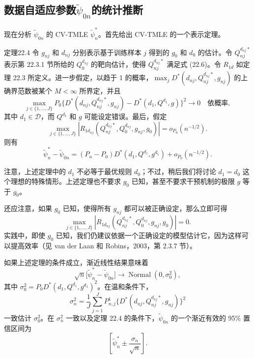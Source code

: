 \subsection{数据自适应参数\texorpdfstring{$\tilde\psi_{0n}$}{ψ̃₀ₙ}的统计推断}

现在分析 $\tilde\psi_{0n}$ 的 CV-TMLE $\tilde\psi_n^*$。首先给出 CV-TMLE 的一个表示定理。

\begin{bookresult}{定理}{22.4}
令 $g_{nj}$ 和 $d_{nj}$ 分别表示基于训练样本 $j$ 得到的 $g_0$ 和 $d_0$ 的估计。令 $Q_{nj}^{d_{nj}*}$ 表示第 22.3.1 节所给的 $Q_0^{d_{nj}}$ 的靶向估计，使得 $Q_{nj}^{d_{nj}*}$ 满足式 (22.6)。令 $R_{1d}$ 如定理 22.3 所定义。进一步假定，以趋于 1 的概率，$\max_jD^*(d_{nj},Q_{nj}^{d_{nj}*},g_{nj})$ 的上确界范数被某个 $M<\infty$ 所界定，并且
\[
 \max_{j\in\{1,\ldots,J\}}P_0
 \bigl\{D^*(d_{nj},Q_{nj}^{d_{nj}*},g_{nj})-D^*(d_1,Q^{d_1},g)\bigr\}^2
 \to0\quad\text{依概率},
\]
其中 $d_1\in\mathcal D$，而 $Q^{d_1}$ 和 $g$ 可能设定错误。最后，假定
\[
 \max_{j\in\{1,\ldots,J\}}
 \left|R_{1d_{nj}}(Q_{nj}^{d_{nj}*},Q_0^{d_{nj}},g_{nj},g_0)\right|
 =o_{P_0}(n^{-1/2}).
\]
则有
\[
 \tilde\psi_n^*-\tilde\psi_{0n}
 =(P_n-P_0)D^*(d_1,Q^{d_1},g^{d_1})+o_{P_0}(n^{-1/2}).
\]
\end{bookresult}

注意，上述定理中的 $d_1$ 不必等于最优规则 $d_0$；不过，稍后我们将讨论 $d_1=d_0$ 这个理想的特殊情形。上述定理也不要求 $g_0$ 已知，甚至不要求干预机制的极限 $g$ 等于 $g_0$。

还应注意，如果 $g_0$ 已知，使得所有 $g_{nj}$ 都可以被正确设定，那么立即可得
\[
 \max_{j\in\{1,\ldots,J\}}
 \left|R_{1d_{nj}}(Q_{nj}^{d_{nj}*},Q_0^{d_{nj}},g_{nj},g_0)\right|=0.
\]
实践中，即使 $g_0$ 已知，我们仍建议依据一个正确设定的模型估计它，因为这样可以提高效率（见 van der Laan 和 Robins，2003，第 2.3.7 节）。

如果上述定理的条件成立，渐近线性结果意味着
\[
 \sqrt n\bigl[\tilde\psi_n^*-\tilde\psi_{0n}\bigr]
 \to\operatorname{Normal}(0,\sigma_0^2),
\]
其中 $\sigma_0^2=P_0D^*(d_1,Q^{d_1},g^{d_1})^2$。在温和条件下，
\[
 \sigma_n^2=\frac1J\sum_{j=1}^JP_{n,j}^1
 \bigl\{D^*(d_{nj},Q_{nj}^{d_{nj}*},g_{nj})\bigr\}^2
\]
一致估计 $\sigma_0^2$。在 $\sigma_n^2$ 一致以及定理 22.4 的条件下，$\tilde\psi_{0n}$ 的一个渐近有效的 95\% 置信区间为
\begin{equation}
 \left[\tilde\psi_n^*\pm\frac{\sigma_n}{\sqrt n}\right].
\tag{22.7}
\end{equation}
